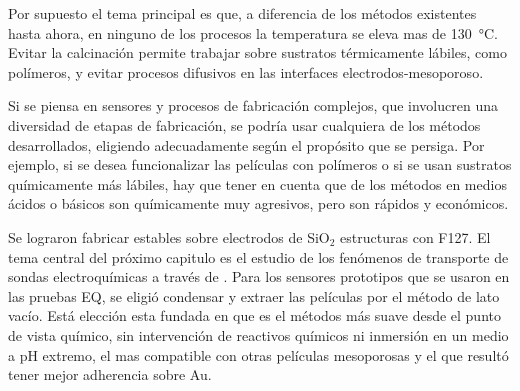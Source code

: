 	Por supuesto el tema principal es que, a diferencia de los métodos existentes hasta ahora, en ninguno de los procesos la temperatura se eleva mas de \SI{130}{\celsius}. Evitar la calcinación permite trabajar sobre sustratos térmicamente lábiles, como polímeros, y evitar procesos difusivos en las interfaces electrodos-mesoporoso. 

	Si se piensa en sensores y procesos de fabricación complejos, que involucren una diversidad de etapas de fabricación, se podría usar cualquiera de los métodos desarrollados, eligiendo adecuadamente según el propósito que se persiga. Por ejemplo, si se desea funcionalizar las películas con polímeros o si se usan sustratos químicamente más lábiles, hay que tener en cuenta que de los métodos en medios ácidos o básicos son químicamente muy agresivos, pero son rápidos y económicos. 

	Se lograron fabricar \pdm\space estables sobre electrodos de SiO$_2$ estructuras con F127. El tema central del próximo capitulo es el estudio de los fenómenos de transporte de sondas electroquímicas a través de \pdm. Para los sensores prototipos que se usaron en las pruebas EQ, se eligió condensar y extraer las películas por el método de lato vacío. Está elección esta fundada en que es el métodos más suave desde el punto de vista químico, sin intervención de reactivos químicos ni inmersión en un medio a pH extremo, el mas compatible con otras películas mesoporosas y el que resultó tener mejor adherencia sobre Au. 			 

	



